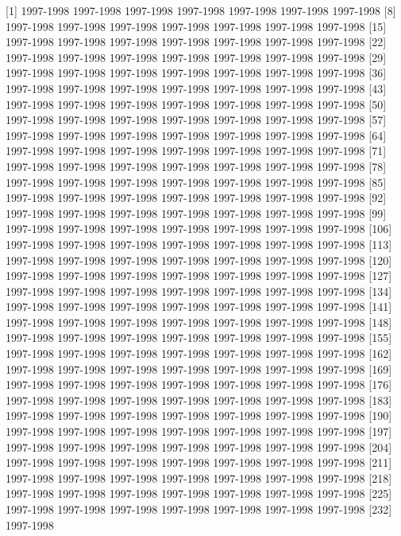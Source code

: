 \documentclass[
]{article}
\begin{document}
{[}1{]} 1997-1998 1997-1998 1997-1998 1997-1998 1997-1998 1997-1998
1997-1998 {[}8{]} 1997-1998 1997-1998 1997-1998 1997-1998 1997-1998
1997-1998 1997-1998 {[}15{]} 1997-1998 1997-1998 1997-1998 1997-1998
1997-1998 1997-1998 1997-1998 {[}22{]} 1997-1998 1997-1998 1997-1998
1997-1998 1997-1998 1997-1998 1997-1998 {[}29{]} 1997-1998 1997-1998
1997-1998 1997-1998 1997-1998 1997-1998 1997-1998 {[}36{]} 1997-1998
1997-1998 1997-1998 1997-1998 1997-1998 1997-1998 1997-1998 {[}43{]}
1997-1998 1997-1998 1997-1998 1997-1998 1997-1998 1997-1998 1997-1998
{[}50{]} 1997-1998 1997-1998 1997-1998 1997-1998 1997-1998 1997-1998
1997-1998 {[}57{]} 1997-1998 1997-1998 1997-1998 1997-1998 1997-1998
1997-1998 1997-1998 {[}64{]} 1997-1998 1997-1998 1997-1998 1997-1998
1997-1998 1997-1998 1997-1998 {[}71{]} 1997-1998 1997-1998 1997-1998
1997-1998 1997-1998 1997-1998 1997-1998 {[}78{]} 1997-1998 1997-1998
1997-1998 1997-1998 1997-1998 1997-1998 1997-1998 {[}85{]} 1997-1998
1997-1998 1997-1998 1997-1998 1997-1998 1997-1998 1997-1998 {[}92{]}
1997-1998 1997-1998 1997-1998 1997-1998 1997-1998 1997-1998 1997-1998
{[}99{]} 1997-1998 1997-1998 1997-1998 1997-1998 1997-1998 1997-1998
1997-1998 {[}106{]} 1997-1998 1997-1998 1997-1998 1997-1998 1997-1998
1997-1998 1997-1998 {[}113{]} 1997-1998 1997-1998 1997-1998 1997-1998
1997-1998 1997-1998 1997-1998 {[}120{]} 1997-1998 1997-1998 1997-1998
1997-1998 1997-1998 1997-1998 1997-1998 {[}127{]} 1997-1998 1997-1998
1997-1998 1997-1998 1997-1998 1997-1998 1997-1998 {[}134{]} 1997-1998
1997-1998 1997-1998 1997-1998 1997-1998 1997-1998 1997-1998 {[}141{]}
1997-1998 1997-1998 1997-1998 1997-1998 1997-1998 1997-1998 1997-1998
{[}148{]} 1997-1998 1997-1998 1997-1998 1997-1998 1997-1998 1997-1998
1997-1998 {[}155{]} 1997-1998 1997-1998 1997-1998 1997-1998 1997-1998
1997-1998 1997-1998 {[}162{]} 1997-1998 1997-1998 1997-1998 1997-1998
1997-1998 1997-1998 1997-1998 {[}169{]} 1997-1998 1997-1998 1997-1998
1997-1998 1997-1998 1997-1998 1997-1998 {[}176{]} 1997-1998 1997-1998
1997-1998 1997-1998 1997-1998 1997-1998 1997-1998 {[}183{]} 1997-1998
1997-1998 1997-1998 1997-1998 1997-1998 1997-1998 1997-1998 {[}190{]}
1997-1998 1997-1998 1997-1998 1997-1998 1997-1998 1997-1998 1997-1998
{[}197{]} 1997-1998 1997-1998 1997-1998 1997-1998 1997-1998 1997-1998
1997-1998 {[}204{]} 1997-1998 1997-1998 1997-1998 1997-1998 1997-1998
1997-1998 1997-1998 {[}211{]} 1997-1998 1997-1998 1997-1998 1997-1998
1997-1998 1997-1998 1997-1998 {[}218{]} 1997-1998 1997-1998 1997-1998
1997-1998 1997-1998 1997-1998 1997-1998 {[}225{]} 1997-1998 1997-1998
1997-1998 1997-1998 1997-1998 1997-1998 1997-1998 {[}232{]} 1997-1998
\end{document}
